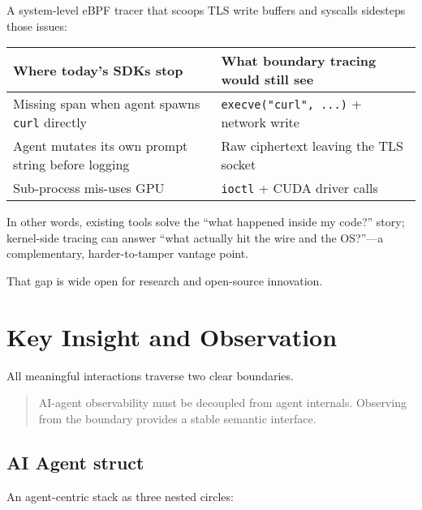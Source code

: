 \documentclass[sigplan,screen，review,9pt]{acmart}
\begin{document}
A system-level eBPF tracer that scoops TLS write buffers and syscalls sidesteps those issues:

\begin{table}[h]
\centering
\small
\begin{tabular}{p{} p{}}
\toprule
\textbf{Where today's SDKs stop} & \textbf{What boundary tracing would still see} \\
\midrule
Missing span when agent spawns \texttt{curl} directly & \texttt{execve("curl", ...)} + network write \\
Agent mutates its own prompt string before logging & Raw ciphertext leaving the TLS socket \\
Sub-process mis-uses GPU & \texttt{ioctl} + CUDA driver calls \\
\bottomrule
\end{tabular}
\end{table}

In other words, existing tools solve the “what happened inside my code?” story; kernel-side tracing can answer “what actually hit the wire and the OS?”—a complementary, harder-to-tamper vantage point.

That gap is wide open for research and open-source innovation.


\section{Key Insight and Observation}

All meaningful interactions traverse two clear boundaries.  
\begin{quote}
  AI-agent observability must be decoupled from agent internals.
  Observing from the boundary provides a stable semantic interface.
\end{quote}

\subsection*{AI Agent struct}
An agent-centric stack as three nested circles:
\end{document}
